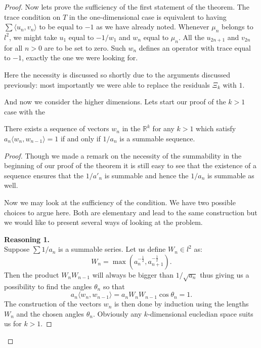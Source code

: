 \begin{proof}
    Now lets prove the sufficiency of the first statement of the theorem.
    The trace condition on $T$ in the one-dimensional case is 
      equivalent to having $\sum \langle u_n, v_n\rangle $ to be equal to $-1$ as we have already noted.
    Whenever $\mu_n$ belongs to $l^2$, we might take $u_1$ equal to $-1/w_1$ and $w_n$ equal to $\mu_n$.
    All the $u_{2n+1}$ and $v_{2n}$ for all $n>0$ are to be set to zero.
    Such $w_n$ defines an operator with trace equal to $-1$, exactly the one we were looking for.
    \begin{remark}
      Here the necessity is discussed so shortly due to the arguments discussed previously: most importantly we
      were able to replace the residuals $\Xi_k$ with $1$.
    \end{remark}
    \noindent And now we consider the higher dimensions. Lets start our proof of the $k > 1$ case with the 
    \begin{prop}
      There exists a sequence of vectors $w_n$ in the $\mathbb{R}^k$ for any $k > 1$ which satisfy $a_n \langle w_n, w_{n-1} \rangle = 1$ if and only if $1/a_n$ is a summable sequence.
    \end{prop}
    \begin{proof}
      Though we made a remark on the necessity of the summability in the beginning of our proof of the theorem it is still easy to see that
        the existence of a sequence ensures that the $1/a'_n$ is summable and hence the $1/a_n$ is summable as well.
      
      Now we may look at the sufficiency of the condition.
      We have two possible choices to argue here.
      Both are elementary and lead to the same construction but we would like to present several ways of looking at the problem.

      \textbf{Reasoning 1.}\\
      Suppose $\sum 1/a_n$ is a summable series. Let us define $W_n \in l^2$ as:
      \[
        W_n = \max(a_n^{-\frac{1}{2}}, a^{-\frac{1}{2}}_{n+1}).
      \]
      Then the product $W_nW_{n-1}$ will always be bigger than $1/\sqrt{a_n}$ thus giving us a possibility to
      find the angles $\theta_n$ so that 
      \[
        a_n \langle w_n, w_{n-1} \rangle = a_n W_n W_{n-1}\cos{\theta_n} = 1.
      \]
      The construction of the vectors $w_n$ is then done by induction using the lengths $W_n$ and the chosen angles $\theta_n$.
      Obviously any $k$-dimensional eucledian space suits us for $k > 1$.


\end{proof}
\end{proof}
